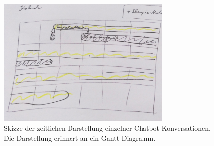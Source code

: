 \begin{figure}[h]
\centering
\includegraphics[width=0.75\textwidth]{pictures/moduluebersicht}
\caption{Skizze der zeitlichen Darstellung einzelner Chatbot-Konversationen. Die Darstellung erinnert an ein Gantt-Diagramm.}
\label{moduluebersicht}
\end{figure}

